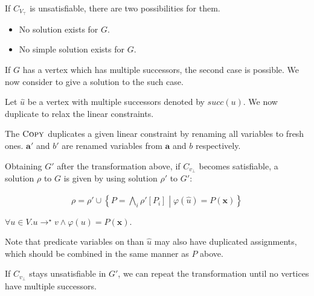 \documentclass[a4paper,12pt]{article}
\newcommand{\path}[2]{#1\rightarrow^\star#2}
\begin{document}
If $C_{V_\top}$ is unsatisfiable, there are two possibilities for them.

\begin{itemize}
\item No solution exists for $G$.
\item No simple solution exists for $G$.
\end{itemize}

If $G$ has a vertex which has multiple successors, the second case is
possible. We now consider to give a solution to the such case.

Let $\hat u$ be a vertex with multiple successors denoted by
$succ(u)$. We now duplicate to relax the linear constraints.





The $\textsc{Copy}$ duplicates a given linear constraint by renaming
all variables to fresh ones. $\mathbf{a'}$ and $b'$ are renamed
variables from $\mathbf{a}$ and $b$ respectively.

Obtaining $G'$ after the transformation above, if $C_{v_\bot}$ becomes
satisfiable, a solution $\rho$ to $G$ is given by using solution
$\rho'$ to $G'$:

\begin{align*}
 \rho = \rho' \cup \left\lbrace P = \bigwedge_i \rho'[P_i] \middle|
 \varphi(\hat u) = P(\mathbf{x}) \right\rbrace
\end{align*}

$\forall u \in V. \path{u}{v} \wedge \varphi(u) = P(\mathbf{x}).
$

Note that predicate variables on  than $\hat u$ may
also have duplicated assignments, which should be combined in the
same manner as $P$ above.

If $C_{v_\bot}$ stays unsatisfiable in $G'$, we can repeat the
transformation until no vertices have multiple successors.
\end{document}
